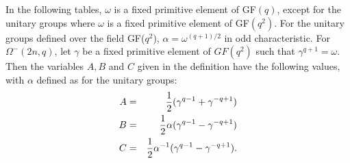 \documentclass[12pt]{report}
\begin{document}
In the following tables, $\omega$ is a fixed primitive element of GF$(q)$, except for the unitary groups where $\omega$ is a fixed primitive element of GF$(q^2)$. For the unitary groups defined over the field GF($q^2$), $\alpha = \omega^{(q+1)/2}$ in odd characteristic. For $\Omega^-(2n, q)$, let $\gamma$ be a fixed primitive element of $GF(q^2)$ such that $\gamma^{q+1} = \omega$. Then the variables $A, B$ and $C$ given in the definition have the following values, with $\alpha$ defined as for the unitary groups: \begin{eqnarray*}
A & = & {1\over2}(\gamma^{q-1}+\gamma^{-q+1}) \\
B & = & {1\over2}\alpha(\gamma^{q-1}-\gamma^{-q+1}) \\
C &=& {1\over2}\alpha^{-1}(\gamma^{q-1}-\gamma^{-q+1}).
\end{eqnarray*}
\end{document}
